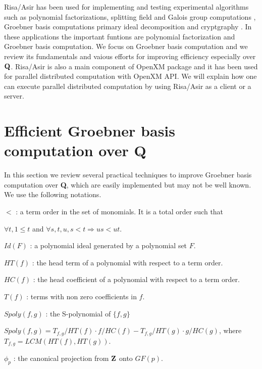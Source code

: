 \documentclass[runningheads]{cl2emult}
\def\Q{{\bf Q}}
\begin{document}
Risa/Asir has been used for implementing and testing experimental
algorithms such as polynomial factorizations, splitting field and
Galois group computations \cite{noro:ANY}, Groebner basis computations
\cite{noro:REPL,noro:NOYO} primary ideal decomposition \cite{noro:SY}
and cryptgraphy \cite{noro:IKNY}.  In these applications the important
funtions are polynomial factorization and Groebner basis
computation. We focus on Groebner basis computation and we review its
fundamentals and vaious efforts for improving efficiency especially
over $\Q$. Risa/Asir is also a main component of OpenXM package and
it has been used for parallel distributed computation with OpenXM API.
We will explain how one can execute parallel distributed computation
by using Risa/Asir as a client or a server.

\section{Efficient Groebner basis computation over {\bf Q}}
\label{tab:gbtech}

In this section we review several practical techniques to improve
Groebner basis computation over {\bf Q}, which are easily
implemented but may not be well known.
We use the following notations.
\begin{description}
\item $<$ : a term order in the set of monomials. It is a total order such that

 $\forall t, 1 \le t$ and $\forall s, t, u, s<t \Rightarrow us<ut$.
\item $Id(F)$ : a polynomial ideal generated by a polynomial set $F$.
\item $HT(f)$ : the head term of a polynomial with respect to a term order.
\item $HC(f)$ : the head coefficient of a polynomial with respect to a term order.
\item $T(f)$ : terms with non zero coefficients in $f$.
\item $Spoly(f,g)$ : the S-polynomial of $\{f,g\}$ 

$Spoly(f,g) = T_{f,g}/HT(f)\cdot f/HC(f) -T_{f,g}/HT(g)\cdot g/HC(g)$, where
$T_{f,g} = LCM(HT(f),HT(g))$.
\item $\phi_p$ : the canonical projection from ${\bf Z}$ onto $GF(p)$.
\end{description}
\end{document}
